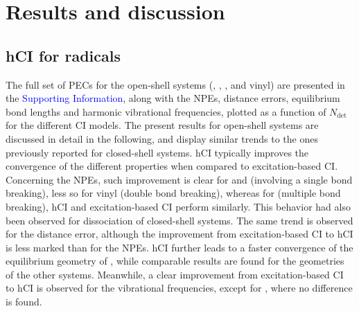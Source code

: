 \documentclass[aip,jcp,reprint,noshowkeys,superscriptaddress]{revtex4-1}
\newcommand{\SupInf}{\textcolor{blue}{Supporting Information}}
\newcommand{\Ndet}{N_\text{det}}
\begin{document}


\section{Results and discussion}
\label{sec:res}


\subsection{hCI for radicals}
\label{sec:res_A}


The full set of PECs for the open-shell systems (, , , and vinyl) are presented in the {\SupInf},
along with the NPEs, distance errors, equilibrium bond lengths and harmonic vibrational frequencies, plotted as a function of $\Ndet$ for the different CI models.
The present results for open-shell systems are discussed in detail in the following,
and display similar trends to the ones previously reported for closed-shell systems. \cite{Kossoski_2022}
hCI typically improves the convergence of the different properties when compared to excitation-based CI.
Concerning the NPEs, such improvement is clear for  and  (involving a single bond breaking), less so for vinyl (double bond breaking),
whereas for  (multiple bond breaking), hCI and excitation-based CI perform similarly.
This behavior had also been observed for dissociation of closed-shell systems. \cite{Kossoski_2022}
The same trend is observed for the distance error, although the improvement from excitation-based CI to hCI is less marked than for the NPEs.
hCI further leads to a faster convergence of the equilibrium geometry of , while comparable results are found for the geometries of the other systems.
Meanwhile, a clear improvement from excitation-based CI to hCI is observed for the vibrational frequencies, except for , where no difference is found.

\end{document}
